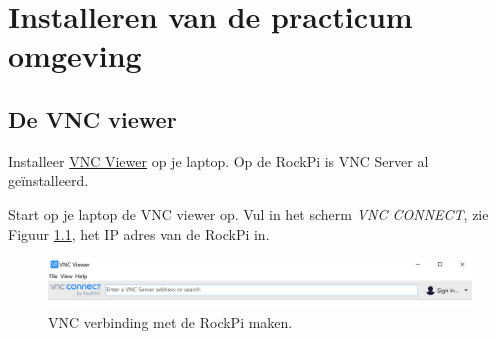\chapter{Installeren van de practicum omgeving} \label{app:instal}


\section{De VNC viewer}
\label{sec:vnc}
Installeer \href{https://www.realvnc.com/en/connect/download/viewer/}{VNC Viewer} op je laptop. Op de RockPi is VNC Server al geïnstalleerd.

Start op je laptop de VNC viewer op. Vul in het scherm \textit{VNC CONNECT}, zie Figuur \ref{fig:winvnc}, het IP adres van de RockPi in.
\begin{figure}[h!]
	\captionsetup{justification=centering}
	\includegraphics[width=1 \linewidth]{figuren/vncopstart}
	\centering
	\caption{VNC verbinding met de RockPi  maken.}
	\label{fig:winvnc}
\end{figure}
